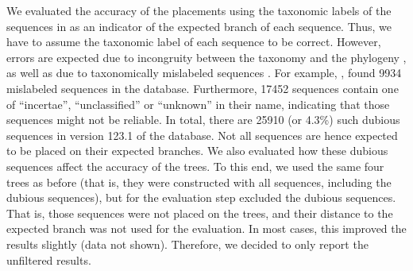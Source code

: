 We evaluated the accuracy of the placements using the taxonomic labels of the sequences in 
as an indicator of the expected branch of each sequence.
Thus, we have to assume the taxonomic label of each sequence to be correct.
However, errors are expected due to incongruity between the taxonomy and the phylogeny \citep{Moreira2000},
as well as due to taxonomically mislabeled sequences \citep{Kozlov2016}.
For example,  \citep{Kozlov2016},
found \num{9 934} mislabeled sequences in the  database.
Furthermore, \num{17 452} sequences contain one of ``incertae'', ``unclassified'' or ``unknown'' in their name,
indicating that those sequences might not be reliable.
In total, there are \num{25 910} (or \num{4.3}\%) such dubious sequences in version 123.1 of the  database.
Not all sequences are hence expected to be placed on their expected branches.
We also evaluated how these dubious sequences affect the accuracy of the trees.
To this end, we used the same four trees as before
(that is, they were constructed with all sequences, including the dubious sequences),
but for the evaluation step excluded the dubious sequences.
That is, those sequences were not placed on the trees,
and their distance to the expected branch was not used for the evaluation.
In most cases, this improved the results slightly (data not shown).
Therefore, we decided to only report the unfiltered results.


